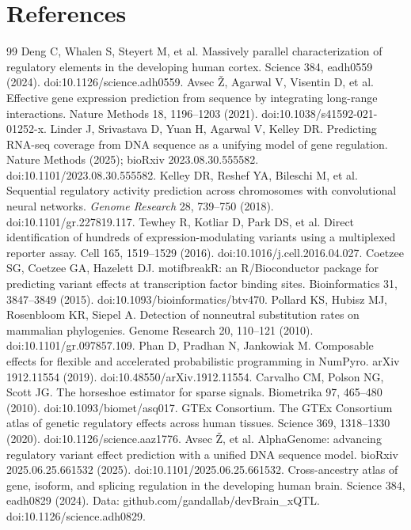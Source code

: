 \documentclass[9pt,twocolumn]{article}
\begin{document}
\section*{References}
\begin{thebibliography}{99}
\small
{} Deng C, Whalen S, Steyert M, et al. Massively parallel characterization of regulatory elements in the developing human cortex. Science 384, eadh0559 (2024). doi:10.1126/science.adh0559.
 Avsec Ž, Agarwal V, Visentin D, et al. Effective gene expression prediction from sequence by integrating long-range interactions. Nature Methods 18, 1196–1203 (2021). doi:10.1038/s41592-021-01252-x.
 Linder J, Srivastava D, Yuan H, Agarwal V, Kelley DR. Predicting RNA-seq coverage from DNA sequence as a unifying model of gene regulation. Nature Methods (2025); bioRxiv 2023.08.30.555582. doi:10.1101/2023.08.30.555582.
 Kelley DR, Reshef YA, Bileschi M, et al. Sequential regulatory activity prediction across chromosomes with convolutional neural networks. \textit{Genome Research} 28, 739--750 (2018). doi:10.1101/gr.227819.117.
 Tewhey R, Kotliar D, Park DS, et al. Direct identification of hundreds of expression-modulating variants using a multiplexed reporter assay. Cell 165, 1519–1529 (2016). doi:10.1016/j.cell.2016.04.027.
 Coetzee SG, Coetzee GA, Hazelett DJ. motifbreakR: an R/Bioconductor package for predicting variant effects at transcription factor binding sites. Bioinformatics 31, 3847–3849 (2015). doi:10.1093/bioinformatics/btv470.
 Pollard KS, Hubisz MJ, Rosenbloom KR, Siepel A. Detection of nonneutral substitution rates on mammalian phylogenies. Genome Research 20, 110–121 (2010). doi:10.1101/gr.097857.109.
 Phan D, Pradhan N, Jankowiak M. Composable effects for flexible and accelerated probabilistic programming in NumPyro. arXiv 1912.11554 (2019). doi:10.48550/arXiv.1912.11554.
 Carvalho CM, Polson NG, Scott JG. The horseshoe estimator for sparse signals. Biometrika 97, 465–480 (2010). doi:10.1093/biomet/asq017.
 GTEx Consortium. The GTEx Consortium atlas of genetic regulatory effects across human tissues. Science 369, 1318–1330 (2020). doi:10.1126/science.aaz1776.
 Avsec \v{Z}, et al. AlphaGenome: advancing regulatory variant effect prediction with a unified DNA sequence model. bioRxiv 2025.06.25.661532 (2025). doi:10.1101/2025.06.25.661532.
 Cross-ancestry atlas of gene, isoform, and splicing regulation in the developing human brain. Science 384, eadh0829 (2024). Data: github.com/gandallab/devBrain_xQTL. doi:10.1126/science.adh0829.

\end{thebibliography}
\end{document}
